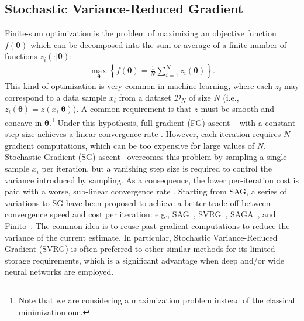 \documentclass{article}
\makeatletter
\theoremstyle{remark}
\theoremstyle{definition}
\DeclareRobustCommand{\eg}{e.g.,\@\xspace}
\DeclareRobustCommand{\ie}{i.e.,\@\xspace}
\newcommand{\vtheta}{\boldsymbol{\theta}}
\makeatother
\begin{document}
\subsection{Stochastic Variance-Reduced Gradient}\label{sec:svrg}
Finite-sum optimization is the problem of maximizing an objective function $f(\vtheta)$ which can be decomposed into the sum or average of a finite number of functions $z_i(\cdot|\vtheta)$:
\begin{align*}
        \max_{\vtheta} \left\{ f(\vtheta) = \frac{1}{N}\sum_{i=1}^{N}z_i(\vtheta)\right\}.
\end{align*}
This kind of optimization is very common in machine learning, where each $z_i$ may correspond to a data sample $x_i$ from a dataset $\mathcal{D}_N$ of size $N$ (\ie $z_i(\vtheta) = z(x_i|\vtheta)$). 
A common requirement is that $z$ must be smooth and concave in $\vtheta$.\footnote{Note that we are considering a maximization problem instead of the classical minimization one.} 
Under this hypothesis, full gradient (FG) ascent ~\citep{cauchy1847methode} with a constant step size achieves a linear convergence rate \cite{nesterov2013introductory}.
However, each iteration requires $N$ gradient computations, which can be too expensive for large values of $N$. Stochastic Gradient (SG) ascent~\citep[\eg][]{robbins1951stochastic,bottou2004large} overcomes this problem by sampling a single sample $x_i$ per iteration, but a vanishing step size is required to control the variance introduced by sampling. As a consequence, the lower per-iteration cost is paid with a worse, sub-linear convergence rate \cite{nemirovskii1983problem}.
Starting from SAG, a series of variations to SG have been proposed to achieve a better trade-off between convergence speed and cost per iteration: \eg SAG~\citep{roux2012stochastic}, SVRG~\cite{johnson2013accelerating}, SAGA~\cite{defazio2014saga}, and Finito~\cite{defazio2014finito}. 
The common idea is to reuse past gradient computations to reduce the variance of the current estimate.
In particular, Stochastic Variance-Reduced Gradient (SVRG) is often preferred to other similar methods for its limited storage requirements, which is a significant advantage when deep and/or wide neural networks are employed.  
\end{document}
